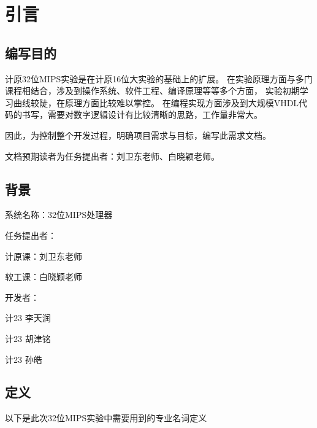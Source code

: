 \section{引言}
    \subsection{编写目的}
        计原32位MIPS实验是在计原16位大实验的基础上的扩展。
        在实验原理方面与多门课程相结合，涉及到操作系统、软件工程、编译原理等等多个方面，
        实验初期学习曲线较陡，在原理方面比较难以掌控。
        在编程实现方面涉及到大规模VHDL代码的书写，需要对数字逻辑设计有比较清晰的思路，工作量非常大。

        因此，为控制整个开发过程，明确项目需求与目标，编写此需求文档。 

        文档预期读者为任务提出者：刘卫东老师、白晓颖老师。
    \subsection{背景}
        系统名称：32位MIPS处理器

        任务提出者：
        \begin{minipage}[t]{0.5\linewidth}
        计原课：刘卫东老师

        软工课：白晓颖老师
        \end{minipage}
        

        开发者：
        \begin{minipage}[t]{0.5\linewidth}
        计23 李天润

        计23 胡津铭

        计23 孙皓
        \end{minipage}

    \subsection{定义}
        以下是此次32位MIPS实验中需要用到的专业名词定义

